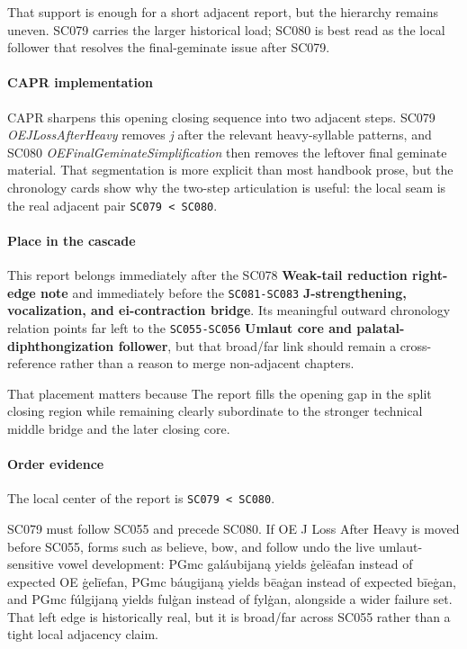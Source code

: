 \documentclass[
  british,
  a4paper,
]{article}
\begin{document}
That support is enough for a short adjacent report, but the hierarchy
remains uneven. SC079 carries the larger historical load; SC080 is best
read as the local follower that resolves the final-geminate issue after
SC079.

\paragraph{CAPR implementation}\label{capr-implementation-49}

CAPR sharpens this opening closing sequence into two adjacent steps.
SC079 \emph{OEJLossAfterHeavy} removes \emph{j} after the relevant
heavy-syllable patterns, and SC080 \emph{OEFinalGeminateSimplification}
then removes the leftover final geminate material. That segmentation is
more explicit than most handbook prose, but the chronology cards show
why the two-step articulation is useful: the local seam is the real
adjacent pair \texttt{SC079\ \textless{}\ SC080}.

\paragraph{Place in the cascade}\label{place-in-the-cascade-49}

This report belongs immediately after the SC078 \textbf{Weak-tail
reduction right-edge note} and immediately before the
\texttt{SC081-SC083} \textbf{J-strengthening, vocalization, and
ei-contraction bridge}. Its meaningful outward chronology relation
points far left to the \texttt{SC055-SC056} \textbf{Umlaut core and
palatal-diphthongization follower}, but that broad/far link should
remain a cross-reference rather than a reason to merge non-adjacent
chapters.

That placement matters because The report fills the opening gap in the
split closing region while remaining clearly subordinate to the stronger
technical middle bridge and the later closing core.

\paragraph{Order evidence}\label{order-evidence-49}

The local center of the report is \texttt{SC079\ \textless{}\ SC080}.

SC079 must follow SC055 and precede SC080. If OE J Loss After Heavy is
moved before SC055, forms such as believe, bow, and follow undo the live
umlaut-sensitive vowel development: PGmc galáubijaną yields ġelēafan
instead of expected OE ġelīefan, PGmc báugijaną yields bēaġan instead of
expected bīeġan, and PGmc fúlgijaną yields fulġan instead of fylġan,
alongside a wider failure set. That left edge is historically real, but
it is broad/far across SC055 rather than a tight local adjacency claim.
\end{document}
